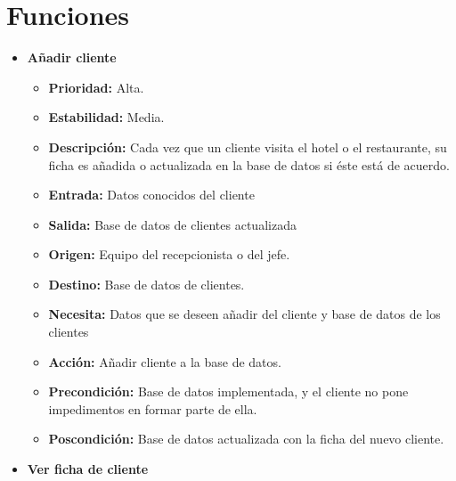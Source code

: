 \documentclass[spanish,a4paper,12pt]{report}	%
\begin{document}

\section{Funciones}

	\begin{itemize}%

		
		\item \textbf{Añadir cliente}  %

			\begin{itemize}
			\item \textbf{Prioridad: }Alta.
			\item \textbf{Estabilidad: }Media.
			\item \textbf{Descripción: }Cada vez que un cliente visita el hotel o el restaurante, su ficha es añadida o actualizada en la base de datos si éste está de acuerdo.
			\item \textbf{Entrada: } Datos conocidos del cliente
			\item \textbf{Salida: }Base de datos de clientes actualizada
			\item \textbf{Origen: }Equipo del recepcionista o del jefe.
			\item \textbf{Destino: }Base de datos de clientes. 
			\item \textbf{Necesita: }Datos que se deseen añadir del cliente y base de datos de los clientes
			\item \textbf{Acción: }Añadir cliente a la base de datos.
			\item \textbf{Precondición: }Base de datos implementada, y el cliente no pone impedimentos en formar parte de ella.
			\item \textbf{Poscondición: }Base de datos actualizada con la ficha del nuevo cliente. 


		\end{itemize}%

		\item \textbf{Ver ficha de cliente}%


\end{itemize}
\end{document}
